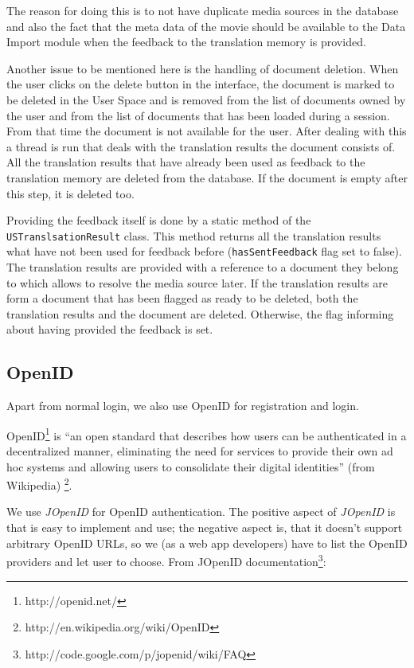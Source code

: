 The reason for doing this is to not have duplicate media sources in the database and also the fact that the meta data of the movie should be available to the Data Import module when the feedback to the translation memory is provided.

Another issue to be mentioned here is the handling of document deletion. When the user clicks on the delete button in the interface, the document is marked to be deleted in the User Space and is removed from the list of documents owned by the user and from the list of documents that has been loaded during a session. From that time the document is not available for the user. After dealing with this a thread is run that deals with the translation results the document consists of. All the translation results that have already been used as feedback to the translation memory are deleted from the database. If the document is empty after this step, it is deleted too.

Providing the feedback itself is done by a static method of the {\tt USTranslsationResult} class. This method returns all the translation results what have not been used for feedback before ({\tt hasSentFeedback} flag set to false). The translation results are provided with a reference to a document they belong to which allows to resolve the media source later. If the translation results are form a document that has been flagged as ready to be deleted, both the translation results and the document are deleted. Otherwise, the flag informing about having provided the feedback is set.

\subsection{OpenID}
\label{us:openid}
Apart from normal login, we also use OpenID for registration and login.

OpenID\footnote{http://openid.net/} is ``an open standard that describes how users can be authenticated in a decentralized manner, eliminating the need for services to provide their own ad hoc systems and allowing users to consolidate their digital identities'' (from Wikipedia) \footnote{http://en.wikipedia.org/wiki/OpenID}.

We use \emph{JOpenID} for OpenID authentication. The positive aspect of \emph{JOpenID} is that is easy to implement and use; the negative aspect is, that it doesn't support arbitrary OpenID URLs, so we (as a web app developers) have to list the OpenID providers and let user to choose. From JOpenID documentation\footnote{http://code.google.com/p/jopenid/wiki/FAQ}:

